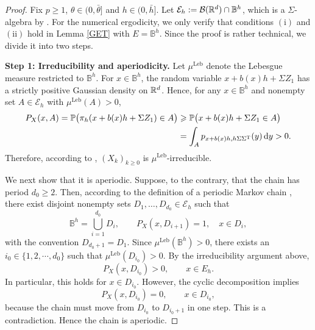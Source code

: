 \documentclass[aap]{imsart}
\theoremstyle{plain}
\theoremstyle{definition}
\begin{document}
\begin{proof}
Fix $p\geqslant 1$, $\theta\in(0, \bar{\theta}]$ and $h\in(0, \bar{h}]$. Let \(\mathcal{E}_h:=\mathcal{B}(\mathbb{R}^d)\cap \mathbb{B}^h\),
which is a $\Sigma$-algebra by \cite[p. 145, Lemma 3]{Pro}.
For the numerical ergodicity, we only verify that conditions $(\mathrm{i})$ and $(\mathrm{ii})$ hold in Lemma \ref{GET} with $E = \mathbb{B}^h$. Since the proof is rather technical, we divide it into two steps.
		
{\bf Step 1: Irreducibility and aperiodicity.} Let \(\mu^{\mathrm{Leb}}\) denote the Lebesgue measure restricted to \(\mathbb{B}^h\). For \(x\in \mathbb B^h\), the random variable \(x+b(x)h+\Sigma Z_1\) has a strictly positive Gaussian density on \(\mathbb{R}^d\). Hence, for any \(x\in\mathbb{B}^h\) and nonempty set
\(A\in\mathcal{E}_h\) with \(\mu^{\mathrm{Leb}}(A)>0\),
\[
\begin{aligned}
P_X(x,A)
=
	\mathbb{P}\big(\pi_h(x+b(x)h+\Sigma Z_1)\in A\big)  &\geqslant
	\mathbb{P}\big(x+b(x)h+\Sigma Z_1\in A\big) \\
	&=
	\int_A p_{x+b(x)h,h\Sigma \Sigma^{\mathrm T}}(y)\,\mathrm{d} y
	>0.
\end{aligned}
\]
Therefore, according to \cite[Proposition 4.2.1]{Meyn}, \((X_k)_{k\geqslant0}\) is  $\mu^{\mathrm{Leb}}$-irreducible.

We next show that it is aperiodic. Suppose, to the contrary, that the chain has
period \(d_0\geqslant2\). Then, according to the definition of a periodic Markov chain \cite[p.122-123]{Meyn}, there exist disjoint nonempty sets
\(D_1,\ldots,D_{d_0}\in\mathcal{E}_h\) such that
\[
\mathbb{B}^h=\bigcup_{i=1}^{d_0}D_i,
\qquad
P_X(x,D_{i+1})=1,\quad x\in D_i,
\]
with the convention \(D_{d_0+1}=D_1\). Since $\mu^{\mathrm{Leb}}(\mathbb{B}^h)>0$, there exists an $i_0\in \{1, 2, \cdots, d_0\}$  such that $\mu^{\mathrm{Leb}}(D_{i_0} )>0$. By the irreducibility argument above,
\[
P_X(x,D_{i_0})>0,
\qquad x\in E_h.
\]
In particular, this holds for \(x\in D_{i_0}\). However, the cyclic decomposition
implies
\[
P_X(x,D_{i_0})=0,
\qquad x\in D_{i_0},
\]
because the chain must move from \(D_{i_0}\) to \(D_{i_0+1}\) in one step. This is
a contradiction. Hence the chain is aperiodic.
		

\end{proof}
\end{document}
